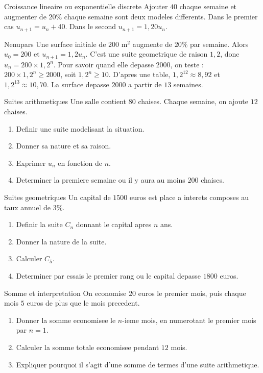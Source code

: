 \documentclass[11pt,a4paper]{article}
\begin{document}
\begin{boiteattention}{Croissance lineaire ou exponentielle discrete}
Ajouter $40$ chaque semaine et augmenter de $20\%$ chaque semaine sont deux modeles differents. Dans le premier cas $u_{n+1}=u_n+40$. Dans le second $u_{n+1}=1,20u_n$.
\end{boiteattention}

\begin{boiteexemple}{Nenupars}
Une surface initiale de $200$ m$^2$ augmente de $20\%$ par semaine. Alors $u_0=200$ et $u_{n+1}=1,2u_n$. C'est une suite geometrique de raison $1,2$, donc $u_n=200\times1,2^n$.
Pour savoir quand elle depasse $2000$, on teste : $200\times1,2^n\ge2000$, soit $1,2^n\ge10$. D'apres une table, $1,2^{12}\approx8,92$ et $1,2^{13}\approx10,70$. La surface depasse $2000$ a partir de $13$ semaines.
\end{boiteexemple}

\begin{exobox}{Suites arithmetiques}
Une salle contient $80$ chaises. Chaque semaine, on ajoute $12$ chaises.
\begin{enumerate}
  \item Definir une suite modelisant la situation.
  \item Donner sa nature et sa raison.
  \item Exprimer $u_n$ en fonction de $n$.
  \item Determiner la premiere semaine ou il y aura au moins $200$ chaises.
\end{enumerate}
\end{exobox}

\begin{exobox}{Suites geometriques}
Un capital de $1500$ euros est place a interets composes au taux annuel de $3\%$.
\begin{enumerate}
  \item Definir la suite $C_n$ donnant le capital apres $n$ ans.
  \item Donner la nature de la suite.
  \item Calculer $C_5$.
  \item Determiner par essais le premier rang ou le capital depasse $1800$ euros.
\end{enumerate}
\end{exobox}

\begin{exobox}{Somme et interpretation}
On economise $20$ euros le premier mois, puis chaque mois $5$ euros de plus que le mois precedent.
\begin{enumerate}
  \item Donner la somme economisee le $n$-ieme mois, en numerotant le premier mois par $n=1$.
  \item Calculer la somme totale economisee pendant $12$ mois.
  \item Expliquer pourquoi il s'agit d'une somme de termes d'une suite arithmetique.
\end{enumerate}
\end{exobox}
\end{document}
